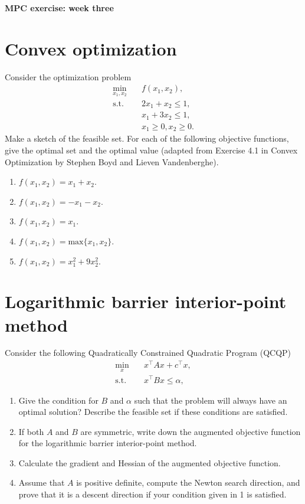 \newpage
\begin{center}
\normalfont\Large\bfseries MPC exercise: week three
\end{center}
\setcounter{section}{0}

\section{Convex optimization}
Consider the optimization problem 
\begin{align*}
    \min_{x_1,x_2} \quad&f(x_1,x_2),\\
    \text{s.t.} \quad&2x_1 +x_2 \leq 1,\\
    &x_1 + 3x_2 \leq 1,\\
    &x_1\geq 0, x_2 \geq 0.
\end{align*}
Make a sketch of the feasible set. For each of the following objective functions, give the optimal set and the optimal value (adapted from Exercise 4.1 in Convex Optimization by Stephen Boyd and Lieven Vandenberghe).
\begin{enumerate}
    \item $f(x_1,x_2) = x_1 + x_2$.
    \item $f(x_1,x_2) = -x_1 - x_2$.
    \item $f(x_1,x_2) = x_1 $.
    \item $f(x_1,x_2) = \text{max}\{x_1,x_2\}$.
    \item $f(x_1,x_2) = x_1^2 + 9x_2^2$.
\end{enumerate}\vspace{5\baselineskip}

\section{Logarithmic barrier interior-point method}
Consider the following Quadratically Constrained Quadratic Program (QCQP)
\begin{align*}
    \min_x \quad &x^{\top}Ax + c^{\top}x,\\
    \text{s.t.}\quad& x^{\top}Bx\leq\alpha,
\end{align*}

\begin{enumerate}
    \item Give the condition for $B$ and $\alpha$ such that the problem will always have an optimal solution? Describe the feasible set if these conditions are satisfied.\vspace{4\baselineskip}
    \item If both $A$ and $B$ are symmetric, write down the augmented objective function for the logarithmic barrier interior-point method.\vspace{4\baselineskip}
    \item Calculate the gradient and Hessian of the augmented objective function. \vspace{4\baselineskip}
    \item Assume that $A$ is positive definite, compute the Newton search direction, and prove that it is a descent direction if your condition given in 1 is satisfied.    
\end{enumerate}
